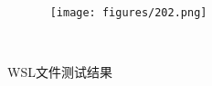 \documentclass[12pt,hyperref,a4paper,UTF8]{ctexart}
\begin{document}
\begin{figure} %
        \centering
        \texttt{[image: figures/202.png]} %
        \caption{WSL文件测试结果} %
        \label{fig:example} %
\end{figure}
\end{document}
